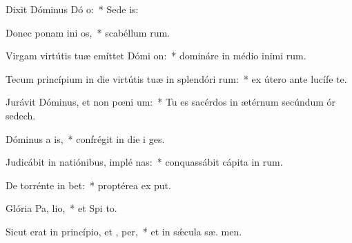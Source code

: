 \item Dixit Dóminus Dó o:~* Sede   is:
\item Donec ponam ini os,~* scabéllum  rum.
\item Virgam virtútis tuæ emíttet Dómi  on:~* domináre in médio inimi rum.
\item Tecum princípium in die virtútis tuæ in splendóri rum:~* ex útero ante lucífe  te.
\item Jurávit Dóminus, et non pœni um:~* Tu es sacérdos in ætérnum secúndum ór sedech.
\item Dóminus a  is,~* confrégit in die i  ges.
\item Judicábit in natiónibus, implé nas:~* conquassábit cápita in  rum.
\item De torrénte in  bet:~* proptérea ex put.
\item Glória Pa,  lio,~* et Spi to.
\item Sicut erat in princípio, et ,  per,~* et in sǽcula sæ. men.
